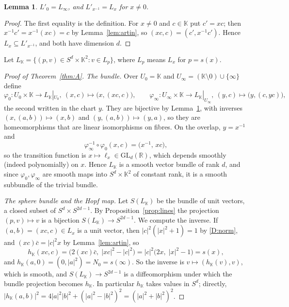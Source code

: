 \documentclass[11pt]{amsart}
\numberwithin{equation}{section}
\theoremstyle{plain}
\newtheorem{lemma}[theorem]{Lemma}
\theoremstyle{definition}
\theoremstyle{remark}
\newcommand{\R}{\mathbb{R}}
\newcommand{\K}{\mathbb{K}}
\begin{document}
\begin{lemma}\label{lem:secondchart}
$L'_0=L_\infty$, and $L'_{x^{-1}}=L_x$ for $x\neq0$.
\end{lemma}

\begin{proof}
The first equality is the definition. For $x\neq0$ and $c\in\K$ put $c'=xc$; then $x^{-1}c'=x^{-1}(xc)=c$ by Lemma~\ref{lem:artin}, so $(xc,c)=(c',x^{-1}c')$. Hence $L_x\subseteq L'_{x^{-1}}$, and both have dimension $d$.
\end{proof}

Let $L_\K=\{(p,v)\in S^d\times\K^2: v\in L_{p}\}$, where $L_p$ means $L_x$ for $p=s(x)$.

\begin{proof}[Proof of Theorem~\ref{thm:A}]
\emph{The bundle.} Over $U_0=\K$ and $U_\infty=(\K\setminus0)\cup\{\infty\}$ define
\[
\varphi_0\colon U_0\times\K\to L_\K|_{U_0},\ (x,c)\mapsto\bigl(x,(xc,c)\bigr),\qquad
\varphi_\infty\colon U_\infty\times\K\to L_\K|_{U_\infty},\ (y,c)\mapsto\bigl(y,(c,yc)\bigr),
\]
the second written in the chart $y$. They are bijective by Lemma~\ref{lem:secondchart}, with inverses $(x,(a,b))\mapsto(x,b)$ and $(y,(a,b))\mapsto(y,a)$, so they are homeomorphisms that are linear isomorphisms on fibres. On the overlap, $y=x^{-1}$ and
\begin{equation}\label{eq:transition}
\varphi_\infty^{-1}\circ\varphi_0(x,c)=\bigl(x^{-1},\,xc\bigr),
\end{equation}
so the transition function is $x\mapsto\ell_x\in\mathrm{GL}_d(\R)$, which depends smoothly (indeed polynomially) on $x$. Hence $L_\K$ is a smooth vector bundle of rank $d$, and since $\varphi_0,\varphi_\infty$ are smooth maps into $S^d\times\K^2$ of constant rank, it is a smooth subbundle of the trivial bundle.

\emph{The sphere bundle and the Hopf map.} Let $S(L_\K)$ be the bundle of unit vectors, a closed subset of $S^d\times S^{2d-1}$. By Proposition~\ref{prop:lines} the projection $(p,v)\mapsto v$ is a bijection $S(L_\K)\to S^{2d-1}$. We compute the inverse. If $(a,b)=(xc,c)\in L_x$ is a unit vector, then $|c|^2(|x|^2+1)=1$ by \ref{D:norm}, and $(xc)\bar c=|c|^2x$ by Lemma~\ref{lem:artin}, so
\[
h_\K(xc,c)=\bigl(2(xc)\bar c,\;|xc|^2-|c|^2\bigr)=|c|^2\bigl(2x,\;|x|^2-1\bigr)=s(x),
\]
and $h_\K(a,0)=(0,|a|^2)=N_0=s(\infty)$. So the inverse is $v\mapsto(h_\K(v),v)$, which is smooth, and $S(L_\K)\to S^{2d-1}$ is a diffeomorphism under which the bundle projection becomes $h_\K$. In particular $h_\K$ takes values in $S^d$; directly, $|h_\K(a,b)|^2=4|a|^2|b|^2+(|a|^2-|b|^2)^2=(|a|^2+|b|^2)^2$.


\end{proof}
\end{document}
